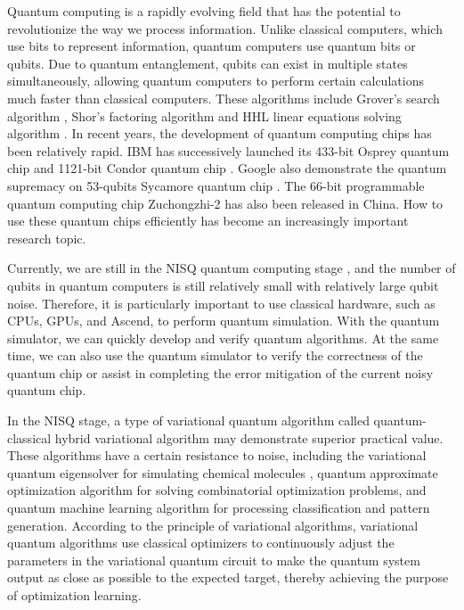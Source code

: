 Quantum computing is a rapidly evolving field that has the potential to revolutionize the way we process information. Unlike classical computers, which use bits to represent information, quantum computers use quantum bits or qubits. Due to quantum entanglement, qubits can exist in multiple states simultaneously, allowing quantum computers to perform certain calculations much faster than classical computers. These algorithms include Grover's search algorithm \cite{grover1996fast, long2001grover}, Shor's factoring algorithm \cite{shor1994algorithms} and HHL linear equations solving algorithm \cite{harrow2009quantum}. In recent years, the development of quantum computing chips has been relatively rapid. IBM has successively launched its 433-bit Osprey quantum chip \cite{ibm2022osprey} and 1121-bit Condor quantum chip \cite{castelvecchi2023ibm}. Google also demonstrate the quantum supremacy on 53-qubits Sycamore quantum chip \cite{arute2019quantum}. The 66-bit programmable quantum computing chip Zuchongzhi-2 \cite{wu2021strong} has also been released in China. How to use these quantum chips efficiently has become an increasingly important research topic.

Currently, we are still in the NISQ quantum computing stage \cite{preskill2018quantum}, and the number of qubits in quantum computers is still relatively small with relatively large qubit noise. Therefore, it is particularly important to use classical hardware, such as CPUs, GPUs, and Ascend, to perform quantum simulation. With the quantum simulator, we can quickly develop and verify quantum algorithms. At the same time, we can also use the quantum simulator to verify the correctness of the quantum chip or assist in completing the error mitigation of the current noisy quantum chip.

In the NISQ stage, a type of variational quantum algorithm \cite{Peruzzo2014Peruzzo2014,cerezo2021variational} called quantum-classical hybrid variational algorithm may demonstrate superior practical value. These algorithms have a certain resistance to noise, including the variational quantum eigensolver for simulating chemical molecules \cite{mcardle2020quantum,cao2019quantum,yeter2020practical,fan2023circuit}, quantum approximate optimization algorithm \cite{farhi2014quantum,PhysRevResearch.4.013141} for solving combinatorial optimization problems, and quantum machine learning algorithm \cite{benedetti2019parameterized,biamonte2017quantum,das2019machine} for processing classification and pattern generation. According to the principle of variational algorithms, variational quantum algorithms use classical optimizers to continuously adjust the parameters in the variational quantum circuit to make the quantum system output as close as possible to the expected target, thereby achieving the purpose of optimization learning.

